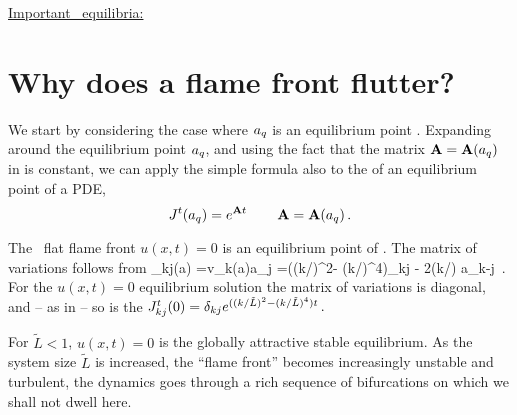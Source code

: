 

\underline{Important \KS\ equilibria:}{ 
%

	} %






\section{Why does a flame front flutter?}


We start by considering the case where
$a_q$ is an equilibrium point . 
Expanding around the equilibrium point $a_q$,
and using the fact that the matrix
${\bf {A}}={\bf {A}}(a_q)$
in 
is constant, 
we can apply the simple formula  also to the 
{\jacobianM}
of an equilibrium point of a PDE, 
\[
 {J}^t(a_q) = e^{{\bf {A}} t}
    \,\qquad
 {\bf {A}}={\bf {A}}(a_q)
\,.
\]

The \KS\ flat flame front $u(x,t)=0$ is an 
equilibrium point of . The matrix of variations
follows from 
\beq
{\Mvar}_{kj}(a) ={\pde v_k(a)\over \pde a_j  }
=((k/)^2- (k/)^4)\delta_{kj} - 2(k/) a_{k-j}
\,.
For the $u(x,t)=0$ equilibrium  solution the matrix of variations
is diagonal, and -- as in  -- so is the {\jacobianM}
$
{J}^t_{kj}(0) = \delta_{kj} e^{((k/\tilde{L})^2- (k/\tilde{L})^4)t}
\,.
$

For $\tilde{L} < 1$,  $u(x,t)=0$ is the globally attractive stable 
equilibrium.
As the system size $\tilde{L}$  is increased,
the ``flame front'' becomes increasingly unstable and turbulent,
the dynamics goes through a rich sequence of
bifurcations on which we shall not dwell here.

